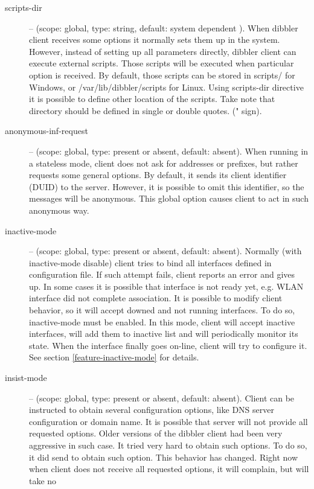\begin{description}
\item[scripts-dir] -- (scope: global, type: string, default: system
  dependent ). When dibbler client receives some options it normally
  sets them up in the system. However, instead of setting up all
  parameters directly, dibbler client can execute external
  scripts. Those scripts will be executed when particular option is
  received. By default, those scripts can be stored in scripts/ for
  Windows, or /var/lib/dibbler/scripts for Linux. Using scripts-dir
  directive it is possible to define other location of the
  scripts. Take note that directory should be defined in single or
  double quotes.  (" sign).
\item[anonymous-inf-request] -- (scope: global, type: present or
  absent, default: absent). When running in a stateless mode, client
  does not ask for addresses or prefixes, but rather requests some
  general options. By default, it sends its client identifier (DUID)
  to the server. However, it is possible to omit this identifier, so
  the  messages will be anonymous. This global option
  causes client to act in such anonymous way.
 \item[inactive-mode] -- (scope: global, type: present or absent,
   default: absent). Normally (with inactive-mode disable) client
   tries to bind all interfaces defined in configuration file. If such
   attempt fails, client reports an error and gives up. In some cases
   it is possible that interface is not ready yet, e.g. WLAN interface
   did not complete association. It is possible to modify client
   behavior, so it will accept downed and not running interfaces. To
   do so, inactive-mode must be enabled. In this mode, client will
   accept inactive interfaces, will add them to inactive list and will
   periodically monitor its state. When the interface finally goes
   on-line, client will try to configure it. See section
   \ref{feature-inactive-mode} for details.
 \item[insist-mode] -- (scope: global, type: present or absent,
   default: absent). Client can be instructed to obtain several
   configuration options, like DNS server configuration or domain
   name. It is possible that server will not provide all requested
   options. Older versions of the dibbler client had been very
   aggressive in such case. It tried very hard to obtain such
   options. To do so, it did send  to obtain such
   option. This behavior has changed. Right now when client does not
   receive all requested options, it will complain, but will take no

\end{description}
